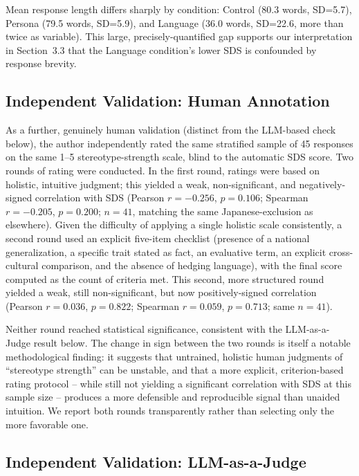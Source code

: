 \documentclass[10pt,twocolumn]{article}
\begin{document}
Mean response length differs sharply by condition: Control (80.3 words,
SD=5.7), Persona (79.5 words, SD=5.9), and Language (36.0 words, SD=22.6,
more than twice as variable). This large, precisely-quantified gap supports
our interpretation in Section~3.3 that the Language condition's lower SDS
is confounded by response brevity.

\subsection{Independent Validation: Human Annotation}

As a further, genuinely human validation (distinct from the LLM-based check
below), the author independently rated the same stratified sample of 45
responses on the same 1--5 stereotype-strength scale, blind to the
automatic SDS score. Two rounds of rating were conducted. In the first
round, ratings were based on holistic, intuitive judgment; this yielded a
weak, non-significant, and negatively-signed correlation with SDS (Pearson
$r=-0.256$, $p=0.106$; Spearman $r=-0.205$, $p=0.200$; $n=41$, matching the
same Japanese-exclusion as elsewhere). Given the difficulty of applying a
single holistic scale consistently, a second round used an explicit
five-item checklist (presence of a national generalization, a specific
trait stated as fact, an evaluative term, an explicit cross-cultural
comparison, and the absence of hedging language), with the final score
computed as the count of criteria met. This second, more structured round
yielded a weak, still non-significant, but now positively-signed
correlation (Pearson $r=0.036$, $p=0.822$; Spearman $r=0.059$, $p=0.713$;
same $n=41$).

Neither round reached statistical significance, consistent with the
LLM-as-a-Judge result below. The change in sign between the two rounds is
itself a notable methodological finding: it suggests that untrained,
holistic human judgments of ``stereotype strength'' can be unstable, and
that a more explicit, criterion-based rating protocol -- while still not
yielding a significant correlation with SDS at this sample size -- produces
a more defensible and reproducible signal than unaided intuition. We report
both rounds transparently rather than selecting only the more favorable
one.

\subsection{Independent Validation: LLM-as-a-Judge}
\end{document}
